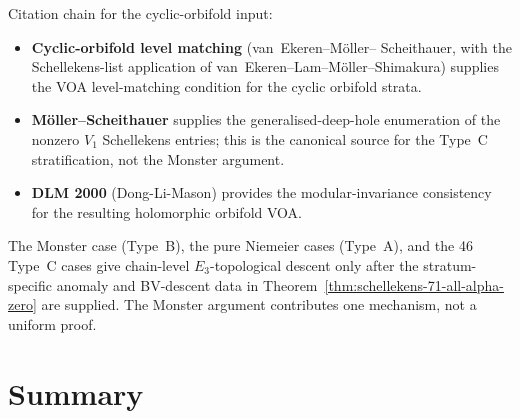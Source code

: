 \begin{remark}
Citation chain for the cyclic-orbifold input:
\begin{itemize}[nosep]
\item \textbf{Cyclic-orbifold level matching} (van~Ekeren--M\"oller--
 Scheithauer, with the Schellekens-list application of
 van~Ekeren--Lam--M\"oller--Shimakura) supplies the VOA
 level-matching condition for the cyclic orbifold strata.
\item \textbf{M\"oller--Scheithauer} supplies the generalised-deep-hole
 enumeration of the nonzero $V_1$ Schellekens entries; this is the
 canonical source for the Type~C stratification, not the Monster
 argument.
\item \textbf{DLM 2000} (Dong-Li-Mason) provides the modular-invariance
 consistency for the resulting holomorphic orbifold VOA.
\end{itemize}

The Monster case (Type~B), the pure Niemeier cases (Type~A), and the
46 Type~C cases give chain-level $E_3$-topological descent only after
the stratum-specific anomaly and BV-descent data in
Theorem~\ref{thm:schellekens-71-all-alpha-zero} are supplied. The
Monster argument contributes one mechanism, not a uniform proof.
\end{remark}

\section{Summary}
\label{sec:monster-chain-level-summary}

